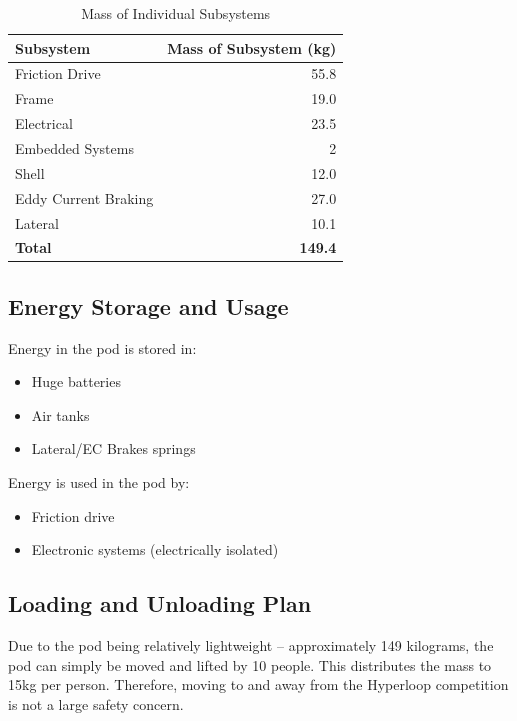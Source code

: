 \documentclass[main.tex]{subfiles}
\begin{document}
\begin{table}[H]
\centering
\begin{tabular}{@{}lr@{}} 
	\toprule Subsystem & Mass of Subsystem (\si{kg}) \\ \midrule
    Friction Drive & 55.8 \\
    Frame & 19.0 \\
    Electrical & 23.5 \\
    Embedded Systems & 2 \\
    Shell & 12.0 \\
    Eddy Current Braking & 27.0 \\
    Lateral & 10.1 \\ \midrule
    \textbf{Total} & \textbf{149.4}
\end{tabular}
  \caption{Mass of Individual Subsystems}
  \label{table:mass}
\end{table}


\subsection{Energy Storage and Usage}
Energy in the pod is stored in:
\begin{itemize}
    \item Huge batteries
    \item Air tanks
    \item Lateral/EC Brakes springs
\end{itemize}
Energy is used in the pod by:
\begin{itemize}
    \item Friction drive
    \item Electronic systems (electrically isolated)
\end{itemize}


\subsection{Loading and Unloading Plan}
Due to the pod being relatively lightweight – approximately 149 kilograms, the pod can simply be moved and lifted by 10 people. This distributes the mass to 15kg per person. Therefore, moving to and away from the Hyperloop competition is not a large safety concern.
\end{document}
